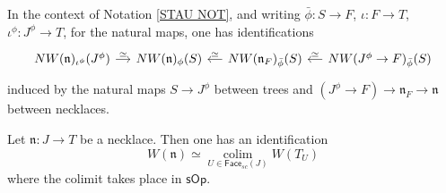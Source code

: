 \documentclass{hha}
\theoremstyle{definition} %
\DeclareMathOperator{\colim}{colim}
\begin{document}
\begin{remark}\label{STAU REM}
	In the context of Notation \ref{STAU NOT},
	and writing 
	$\bar{\phi} \colon S \to F$,
	$\iota \colon F \to T$,
	$\iota^{\phi} \colon J^{\phi} \to T$,
	for the natural maps,
	one has identifications
	\begin{equation}
	\begin{tikzcd}[column sep = 12pt]
	NW(\mathfrak{n})_{\iota^{\phi}}(J^{\phi}) 
	\ar{r}{\simeq}
	&
	NW(\mathfrak{n})_{\phi}(S)
	&
	NW(\mathfrak{n}_F)_{\bar{\phi}}(S)
	\ar{l}[swap]{\simeq}
	&
	NW(J^{\phi} \to F)_{\bar{\phi}}(S)
	\ar{l}[swap]{\simeq}
	\end{tikzcd}
	\end{equation}
	induced by the natural maps
	$S \to J^{\phi}$ between trees and 
	$(J^{\phi} \to F) \to
	\mathfrak{n}_F \to \mathfrak{n}$
	between necklaces.
\end{remark}




\begin{proposition}\label{NECKCOL PROP}
	Let $\mathfrak{n} \colon J \to T$ be a necklace.
	Then one has an identification
	\begin{equation}\label{NECKCOL EQ}
	W(\mathfrak{n})
	\simeq 
	\underset{U \in \mathsf{Face}_{sc}(J)}{\colim}
	W(T_U)
	\end{equation}
	where the colimit takes place 
	in $\mathsf{sOp}$.
\end{proposition}
\end{document}
